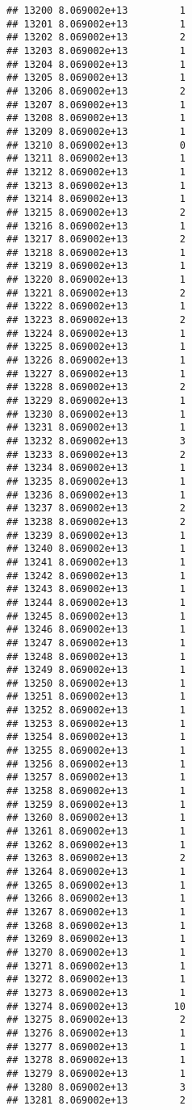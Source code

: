 \documentclass[
]{article}
\begin{document}
\begin{verbatim}
## 13200 8.069002e+13         1
## 13201 8.069002e+13         1
## 13202 8.069002e+13         2
## 13203 8.069002e+13         1
## 13204 8.069002e+13         1
## 13205 8.069002e+13         1
## 13206 8.069002e+13         2
## 13207 8.069002e+13         1
## 13208 8.069002e+13         1
## 13209 8.069002e+13         1
## 13210 8.069002e+13         0
## 13211 8.069002e+13         1
## 13212 8.069002e+13         1
## 13213 8.069002e+13         1
## 13214 8.069002e+13         1
## 13215 8.069002e+13         2
## 13216 8.069002e+13         1
## 13217 8.069002e+13         2
## 13218 8.069002e+13         1
## 13219 8.069002e+13         1
## 13220 8.069002e+13         1
## 13221 8.069002e+13         2
## 13222 8.069002e+13         1
## 13223 8.069002e+13         2
## 13224 8.069002e+13         1
## 13225 8.069002e+13         1
## 13226 8.069002e+13         1
## 13227 8.069002e+13         1
## 13228 8.069002e+13         2
## 13229 8.069002e+13         1
## 13230 8.069002e+13         1
## 13231 8.069002e+13         1
## 13232 8.069002e+13         3
## 13233 8.069002e+13         2
## 13234 8.069002e+13         1
## 13235 8.069002e+13         1
## 13236 8.069002e+13         1
## 13237 8.069002e+13         2
## 13238 8.069002e+13         2
## 13239 8.069002e+13         1
## 13240 8.069002e+13         1
## 13241 8.069002e+13         1
## 13242 8.069002e+13         1
## 13243 8.069002e+13         1
## 13244 8.069002e+13         1
## 13245 8.069002e+13         1
## 13246 8.069002e+13         1
## 13247 8.069002e+13         1
## 13248 8.069002e+13         1
## 13249 8.069002e+13         1
## 13250 8.069002e+13         1
## 13251 8.069002e+13         1
## 13252 8.069002e+13         1
## 13253 8.069002e+13         1
## 13254 8.069002e+13         1
## 13255 8.069002e+13         1
## 13256 8.069002e+13         1
## 13257 8.069002e+13         1
## 13258 8.069002e+13         1
## 13259 8.069002e+13         1
## 13260 8.069002e+13         1
## 13261 8.069002e+13         1
## 13262 8.069002e+13         1
## 13263 8.069002e+13         2
## 13264 8.069002e+13         1
## 13265 8.069002e+13         1
## 13266 8.069002e+13         1
## 13267 8.069002e+13         1
## 13268 8.069002e+13         1
## 13269 8.069002e+13         1
## 13270 8.069002e+13         1
## 13271 8.069002e+13         1
## 13272 8.069002e+13         1
## 13273 8.069002e+13         1
## 13274 8.069002e+13        10
## 13275 8.069002e+13         2
## 13276 8.069002e+13         1
## 13277 8.069002e+13         1
## 13278 8.069002e+13         1
## 13279 8.069002e+13         1
## 13280 8.069002e+13         3
## 13281 8.069002e+13         2

\end{verbatim}
\end{document}
